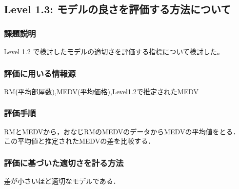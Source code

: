 \subsection{Level 1.3: モデルの良さを評価する方法について}

\subsubsection{課題説明}
Level 1.2 で検討したモデルの適切さを評価する指標について検討した。

\subsubsection{評価に用いる情報源}

RM(平均部屋数),MEDV(平均価格),Level1.2で推定されたMEDV

\subsubsection{評価手順}

RMとMEDVから，おなじRMのMEDVのデータからMEDVの平均値をとる．\\
この平均値と推定されたMEDVの差を比較する．

\subsubsection{評価に基づいた適切さを計る方法}

差が小さいほど適切なモデルである．